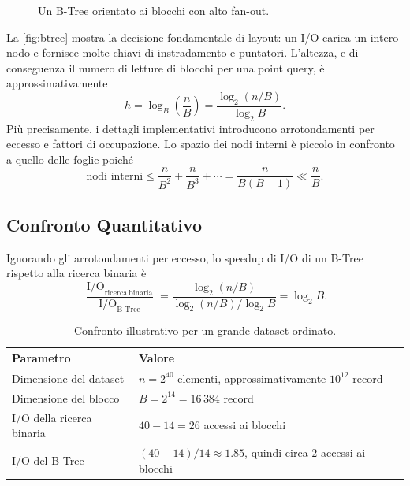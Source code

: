 \begin{figure}[H]
  \centering
  \caption{Un B-Tree orientato ai blocchi con alto fan-out.}
  \label{fig:btree}
\end{figure}

La \autoref{fig:btree} mostra la decisione fondamentale di layout: un I/O carica un intero nodo e fornisce molte chiavi di instradamento e puntatori. L'altezza, e di conseguenza il numero di letture di blocchi per una point query, è approssimativamente
\[
  h = \log_B\!\left(\frac{n}{B}\right)
    = \frac{\log_2(n/B)}{\log_2 B}.
\]
Più precisamente, i dettagli implementativi introducono arrotondamenti per eccesso e fattori di occupazione. Lo spazio dei nodi interni è piccolo in confronto a quello delle foglie poiché
\[
  \text{nodi interni}
  \leq \frac{n}{B^2}+\frac{n}{B^3}+\cdots
  = \frac{n}{B(B-1)}
  \ll \frac{n}{B}.
\]

\FloatBarrier
\subsection{Confronto Quantitativo}
\label{subsec:btree-comparison}

Ignorando gli arrotondamenti per eccesso, lo speedup di I/O di un B-Tree rispetto alla ricerca binaria è
\[
  \frac{\operatorname{I/O}_{\mathrm{ricerca\ binaria}}}
       {\operatorname{I/O}_{\mathrm{B\text{-}Tree}}}
  = \frac{\log_2(n/B)}{\log_2(n/B)/\log_2 B}
  = \log_2 B.
\]

\begin{table}[H]
  \centering
  \caption{Confronto illustrativo per un grande dataset ordinato.}
  \label{tab:btree-example}
  \begin{tabularx}{\textwidth}{@{}lX@{}}
    \toprule
    Parametro & Valore \\
    \midrule
    Dimensione del dataset & $n=2^{40}$ elementi, approssimativamente $10^{12}$ record \\
    Dimensione del blocco & $B=2^{14}=16\,384$ record \\
    I/O della ricerca binaria & $40-14=26$ accessi ai blocchi \\
    I/O del B-Tree & $(40-14)/14\approx1.85$, quindi circa $2$ accessi ai blocchi \\
    \bottomrule
  \end{tabularx}
\end{table}

